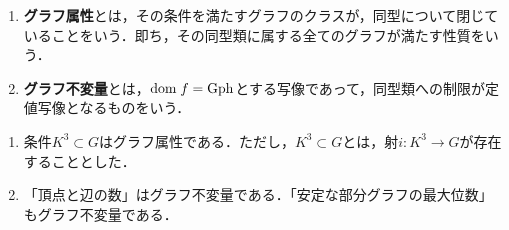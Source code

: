 \documentclass[uplatex,dvipdfmx]{jsreport}
\begin{document}
\begin{definition}\mbox{}
    \begin{enumerate}
        \item \textbf{グラフ属性}とは，その条件を満たすグラフのクラスが，同型について閉じていることをいう．即ち，その同型類に属する全てのグラフが満たす性質をいう．
        \item \textbf{グラフ不変量}とは，$\mathrm{dom}\; f=\mathrm{Gph}$とする写像であって，同型類への制限が定値写像となるものをいう．
    \end{enumerate}
\end{definition}
\begin{example}\mbox{}
    \begin{enumerate}
        \item 条件$K^3\subset G$はグラフ属性である．ただし，$K^3\subset G$とは，射$i:K^3\to G$が存在することとした．
        \item 「頂点と辺の数」はグラフ不変量である．「安定な部分グラフの最大位数」もグラフ不変量である．
    \end{enumerate}
\end{example}
\end{document}
